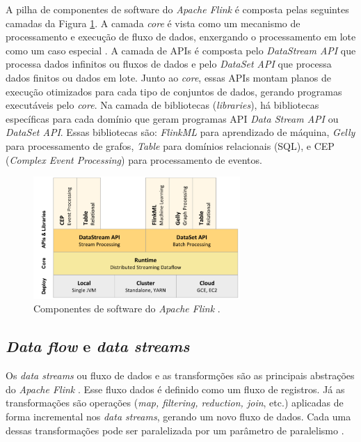 A pilha de componentes de software do \emph{Apache Flink} é composta pelas seguintes camadas da Figura \ref{software-flink}. A camada \emph{core} é vista como um mecanismo de processamento e execução de fluxo de dados, enxergando o processamento em lote como um caso especial \cite{Lopez2018,Carbone2015}. A camada de APIs é composta pelo \emph{DataStream API} que processa dados infinitos ou fluxos de dados e pelo \emph{DataSet API} que processa dados finitos ou dados em lote. Junto ao \emph{core}, essas APIs montam planos de execução otimizados para cada tipo de conjuntos de dados, gerando programas executáveis pelo \emph{core}. Na camada de bibliotecas (\emph{libraries}), há bibliotecas específicas para cada domínio que geram programas API \emph{Data Stream API} ou \emph{DataSet API}. Essas bibliotecas são: \emph{FlinkML} para aprendizado de máquina, \emph{Gelly} para processamento de grafos, \emph{Table} para domínios relacionais (SQL), e CEP (\emph{Complex Event Processing}) para processamento de eventos.

\begin{figure}[ht]
\centering
\includegraphics[width=0.7\textwidth]{figuras/software-flink.png}
\caption{Componentes de software do \emph{Apache Flink} \cite{Carbone2015}.}
\label{software-flink}
\end{figure}

\subsection{\emph{Data flow} e \emph{data streams}}

Os \emph{data streams} ou fluxo de dados e as transformções são as principais abstrações do \emph{Apache Flink} \cite{Lopez2018,ApacheFlink2020}. Esse fluxo dados é definido como um fluxo de registros. Já as transformações são operações (\emph{map, filtering, reduction, join}, etc.) aplicadas de forma incremental nos \emph{data streams}, gerando um novo fluxo de dados. Cada uma dessas transformações pode ser paralelizada por um parâmetro de paralelismo \cite{Lopez2018}.

